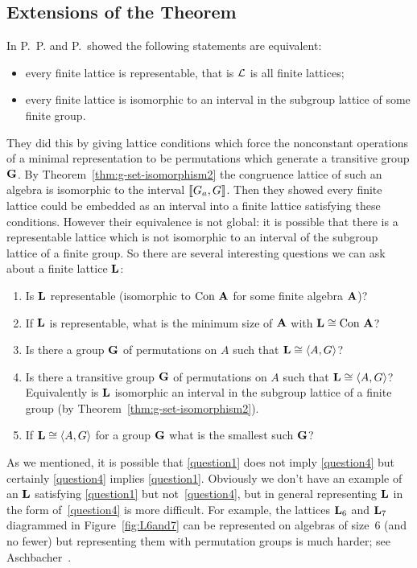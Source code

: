 \subsection{Extensions of the \Palfy \Pudlak Theorem}
In \cite{PalfyPudlak1980} P.~P. \Palfy and P.~\Pudlak showed the
following statements are equivalent:
\begin{itemize}
\item
every finite lattice is representable, that is $\mathcal{L}$ is all
finite lattices;
\item
every finite lattice is isomorphic to an 
interval in the subgroup lattice of some finite group.
\end{itemize}
They did this by giving lattice conditions which force the
nonconstant operations of a minimal
representation to be permutations which generate a transitive
group $\mathbf{G}$.
By Theorem~\ref{thm:g-set-isomorphism2}
the congruence lattice of such an algebra is isomorphic to 
the interval $\llbracket G_a,G \rrbracket$. 
Then they showed every finite lattice could be embedded 
as an interval into a finite lattice satisfying these conditions.
However their equivalence is not global: it is possible that there 
is a representable lattice which is not isomorphic to an interval
of the subgroup lattice of a finite group. So there are several 
interesting questions we can ask about a finite lattice
$\mathbf{L}$:
\begin{enumerate}
\item\label{question1}
Is $\mathbf{L}$ representable (isomorphic to $\operatorname{Con\,} \mathbf{A}$ for some finite algebra $\mathbf{A}$)?
\item\label{question2}
If $\mathbf{L}$ is representable, what is the minimum size of $\mathbf{A}$ with $\mathbf{L} \cong\operatorname{Con\,} \mathbf{A}$?
\item\label{question3}
Is there a group $\mathbf{G}$ of permutations on $A$ such that $\mathbf{L} \cong \langle A,G\rangle$?
\item\label{question4}
Is there a transitive group $\mathbf{G}$ of permutations on $A$ such that $\mathbf{L} \cong \langle A,G\rangle$?
Equivalently is $\mathbf{L}$ isomorphic an interval in the subgroup lattice of a finite group
(by Theorem~\ref{thm:g-set-isomorphism2}).
\item\label{question5}
If $\mathbf{L} \cong \langle A,G\rangle$ for a group $\mathbf{G}$ what is the smallest such $\mathbf{G}$?
\end{enumerate}
As we mentioned, it is possible that \eqref{question1} does not imply \eqref{question4} 
but certainly \eqref{question4} implies \eqref{question1}. Obviously we don't have 
an example of an $\mathbf{L}$ satisfying \eqref{question1} but not~\eqref{question4}, but 
in general representing $\mathbf{L}$ 
in the form of~\eqref{question4}
is more difficult. For example,
the lattices $\mathbf{L}_6$ and $\mathbf{L}_7$ diagrammed in Figure~\ref{fig:L6and7}
can be represented on algebras of size~6 (and no fewer)
but representing them with permutation groups is much harder; 
see Aschbacher~\cite{Aschbacher2008}.

